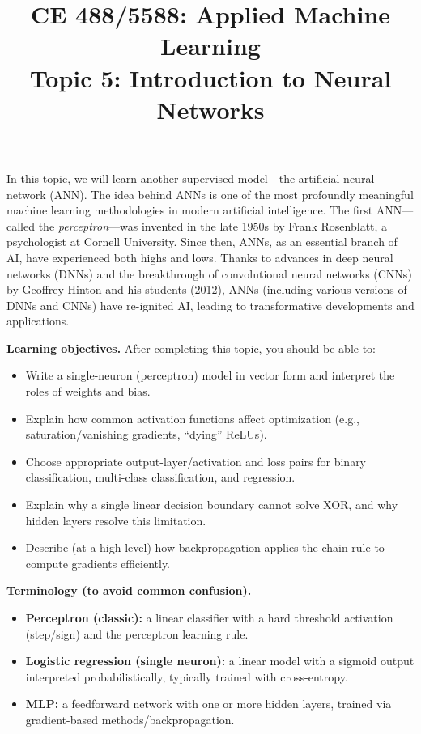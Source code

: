 \documentclass[12pt]{article}
\begin{document}
\doublespacing	


\title{CE 488/5588: Applied Machine Learning\\ \large Topic 5: Introduction to Neural Networks}
\author{}
\date{}
\maketitle

In this topic, we will learn another supervised model---the artificial neural network (ANN). The idea behind ANNs is one of the most profoundly meaningful machine learning methodologies in modern artificial intelligence. The first ANN---called the \textit{perceptron}---was invented in the late 1950s by Frank Rosenblatt, a psychologist at Cornell University. Since then, ANNs, as an essential branch of AI, have experienced both highs and lows. Thanks to advances in deep neural networks (DNNs) and the breakthrough of convolutional neural networks (CNNs) by Geoffrey Hinton and his students (2012), ANNs (including various versions of DNNs and CNNs) have re-ignited AI, leading to transformative developments and applications.

\noindent\textbf{Learning objectives.} After completing this topic, you should be able to:
\begin{itemize}
    \item Write a single-neuron (perceptron) model in vector form and interpret the roles of weights and bias.
    \item Explain how common activation functions affect optimization (e.g., saturation/vanishing gradients, ``dying'' ReLUs).
    \item Choose appropriate output-layer/activation and loss pairs for binary classification, multi-class classification, and regression.
    \item Explain why a single linear decision boundary cannot solve XOR, and why hidden layers resolve this limitation.
    \item Describe (at a high level) how backpropagation applies the chain rule to compute gradients efficiently.
\end{itemize}

\vspace{0.5em}
\noindent\textbf{Terminology (to avoid common confusion).}
\begin{itemize}
    \item \textbf{Perceptron (classic):} a linear classifier with a hard threshold activation (step/sign) and the perceptron learning rule.
    \item \textbf{Logistic regression (single neuron):} a linear model with a sigmoid output interpreted probabilistically, typically trained with cross-entropy.
    \item \textbf{MLP:} a feedforward network with one or more hidden layers, trained via gradient-based methods/backpropagation.
\end{itemize}
\end{document}
